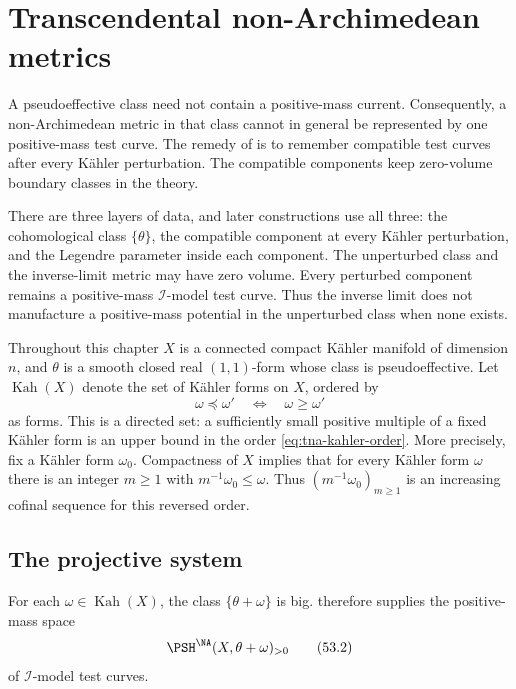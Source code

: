 \chapter{Transcendental non-Archimedean metrics}
\label{chap:transcendental-metrics}

A pseudoeffective class need not contain a positive-mass current.
Consequently, a non-Archimedean metric in that class cannot in general
be represented by one positive-mass test curve.  The remedy of
\cite{DXZ23} is to remember compatible test curves after every K\"ahler
perturbation.  The compatible components keep zero-volume boundary
classes in the theory.

There are three layers of data, and later constructions use all three:
the cohomological class $\{\theta\}$, the compatible component at every
K\"ahler perturbation, and the Legendre parameter inside each component.
The unperturbed class and the inverse-limit metric may have zero volume.
Every perturbed component remains a positive-mass $\mathcal I$-model test curve.  Thus the inverse limit does
not manufacture a positive-mass potential in the unperturbed class when
none exists.

Throughout this chapter $X$ is a connected compact K\"ahler manifold of
dimension $n$, and $\theta$ is a smooth closed real $(1,1)$-form
whose class is pseudoeffective.  Let $\operatorname{Kah}(X)$ denote
the set of K\"ahler forms on $X$, ordered by
\[
                  \omega\preceq\omega'
                  \quad\Longleftrightarrow\quad
                  \omega\geq\omega'
\tag{53.1}\label{eq:tna-kahler-order}
\]
as forms.  This is a directed set: a sufficiently small positive
multiple of a fixed K\"ahler form is an upper bound in the order
\eqref{eq:tna-kahler-order}.
More precisely, fix a K\"ahler form $\omega_0$.
Compactness of $X$ implies that for every K\"ahler form $\omega$
there is an integer $m\geq1$ with $m^{-1}\omega_0\leq\omega$.
Thus $(m^{-1}\omega_0)_{m\geq1}$ is an increasing cofinal sequence
for this reversed order.

\section{The projective system}
\label{sec:tna-projective-system}

For each $\omega\in\operatorname{Kah}(X)$, the class
$\{\theta+\omega\}$ is big.  
therefore supplies the positive-mass space
\[
             \PSH^{\NA}(X,\theta+\omega)_{>0}
\tag{53.2}\label{eq:tna-positive-component-space}
\]
of $\mathcal I$-model test curves.

